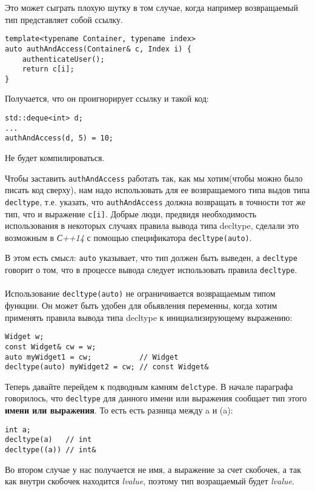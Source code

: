 		Это может сыграть плохую шутку в том случае, когда например возвращаемый тип представляет собой ссылку.
\begin{verbatim}
template<typename Container, typename index>
auto authAndAccess(Container& c, Index i) {
	authenticateUser();
	return c[i];
}
\end{verbatim}
		Получается, что он проигнорирует ссылку и такой код:
\begin{verbatim}
std::deque<int> d;
...
authAndAccess(d, 5) = 10;
\end{verbatim}
		Не будет компилироваться.
		
		Чтобы заставить \texttt{authAndAccess} работать так, как мы хотим(чтобы можно было писать код сверху), нам надо использовать для ее возвращаемого типа выдов типа \texttt{decltype}, т.е. указать, что \texttt{authAndAccess} должна возвращать в точности тот же тип, что и выражение \texttt{c[i]}. Добрые люди, предвидя необходимость использования в некоторых случаях правила вывода типа decltype, сделали это возможным в \textit{С++14} с помощью спецификатора \texttt{decltype(auto)}.
		
		В этом есть смысл: \texttt{auto} указывает, что тип должен быть выведен, а \texttt{decltype} говорит о том, что в процессе вывода следует использовать правила \texttt{decltype}. \\\\
		Использование \texttt{decltype(auto)} не ограничивается возвращаемым типом функции. Он может быть удобен для обьявления переменны, когда хотим применять правила вывода типа decltype к инициализирующему выражению:
\begin{verbatim}
Widget w;
const Widget& cw = w;
auto myWidget1 = cw;           // Widget
decltype(auto) myWidget2 = cw; // const Widget&
\end{verbatim}
		Теперь давайте перейдем к подводным камням \texttt{delctype}. В начале параграфа говорилось, что \texttt{decltype} для данного имени или выражения сообщает тип этого \textbf{имени или выражения}. То есть есть разница между a и (a):
\begin{verbatim}
int a;
decltype(a)   // int
decltype((a)) // int&
\end{verbatim}
		Во втором случае у нас получается не имя, а выражение за счет скобочек, а так как внутри скобочек находится \textit{lvalue}, поэтому тип возращаемый будет \textit{lvalue}.
		
